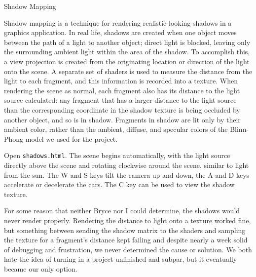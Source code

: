 


Shadow Mapping

Shadow mapping is a technique for rendering realistic-looking shadows in a graphics application. In real life, shadows are created when one object moves between the path of a light to another object; direct light is blocked, leaving only the surrounding ambient light within the area of the shadow. To accomplish this, a view projection is created from the originating location or direction of the light onto the scene. A separate set of shaders is used to measure the distance from the light to each fragment, and this information is recorded into a texture. When rendering the scene as normal, each fragment also has its distance to the light source calculated: any fragment that has a larger distance to the light source than the corresponding coordinate in the shadow texture is being occluded by another object, and so is in shadow. Fragments in shadow are lit only by their ambient color, rather than the ambient, diffuse, and specular colors of the Blinn-Phong model we used for the project.

Open \texttt{shadows.html}. The scene begins automatically, with the light source directly above the scene and rotating clockwise around the scene, similar to light from the sun. The W and S keys tilt the camera up and down, the A and D keys accelerate or decelerate the cars. The C key can be used to view the shadow texture.

For some reason that neither Bryce nor I could determine, the shadows would never render properly. Rendering the distance to light onto a texture worked fine, but something between sending the shadow matrix to the shaders and sampling the texture for a fragment's distance kept failing and despite nearly a week solid of debugging and frustration, we never determined the cause or solution. We both hate the idea of turning in a project unfinished and subpar, but it eventually became our only option.

